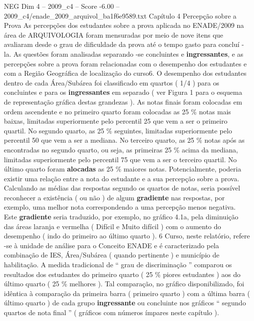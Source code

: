 \begin{textsample}{NEG Dim 4 – 2009\_c4 – Score -6.00 – 2009\_c4/enade\_2009\_arquivol\_ba1f6e9589.txt}  \label{ex:f4_neg_021}
Capítulo 4 Percepção sobre a Prova As percepções dos estudantes sobre a prova aplicada no ENADE/2009 na área de ARQUIVOLOGIA foram mensuradas por meio de nove itens que avaliaram desde o grau de dificuldade da prova até o tempo gasto para concluí -la.
As questões foram analisadas separando -se concluintes e \textbf{ingressantes}, e as percepções sobre a prova foram relacionadas com o desempenho dos estudantes e com a Região Geográfica de localização do curso6.
O desempenho dos estudantes dentro de cada Área/Subárea foi classificado em quartos ( 1/4 ) para os concluintes e para os \textbf{ingressantes} em separado ( ver Figura 1 para o esquema de representação gráfica destas grandezas ).
As notas finais foram colocadas em ordem ascendente e no primeiro quarto foram colocadas as 25 \% notas mais baixas, limitadas superiormente pelo percentil 25 que vem a ser o primeiro quartil.
No segundo quarto, as 25 \% seguintes, limitadas superiormente pelo percentil 50 que vem a ser a mediana.
No terceiro quarto, as 25 \% notas após as encontradas no segundo quarto, ou seja, as primeiras 25 \% acima da mediana, limitadas superiormente pelo percentil 75 que vem a ser o terceiro quartil.
No último quarto foram \textbf{alocadas} as 25 \% maiores notas.
Potencialmente, poderia existir uma relação entre a nota do estudante e a sua percepção sobre a prova.
Calculando as médias das respostas segundo os quartos de notas, seria possível reconhecer a existência ( ou não ) de algum \textbf{gradiente} nas respostas, por exemplo, uma melhor nota correspondendo a uma percepção menos negativa.
Este \textbf{gradiente} seria traduzido, por exemplo, no gráfico 4.1a, pela diminuição das áreas laranja e vermelha ( Difícil e Muito difícil ) com o aumento do desempenho ( indo do primeiro ao último quarto ). 6 Curso, neste relatório, refere -se à unidade de análise para o Conceito ENADE e é caracterizado pela combinação de IES, Área/Subárea ( quando pertinente ) e município de habilitação.
A medida tradicional de “ grau de discriminação ” comparou os resultados dos estudantes do primeiro quarto ( 25 \% piores estudantes ) aos do último quarto ( 25 \% melhores ).
Tal comparação, no gráfico disponibilizado, foi idêntica à comparação da primeira barra ( primeiro quarto ) com a última barra ( último quarto ) de cada grupo \textbf{ingressante} ou concluinte nos gráficos “ segundo quartos de nota final ” ( gráficos com números ímpares neste capítulo ).

\end{textsample}
